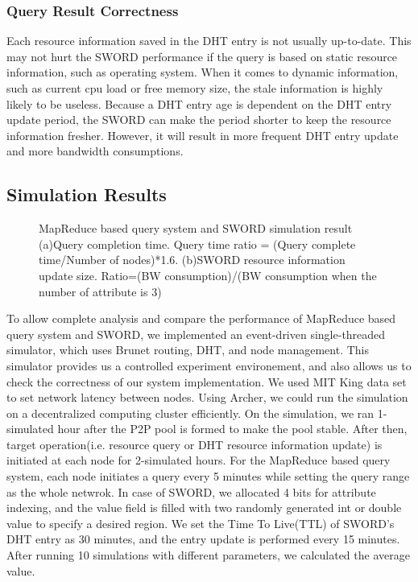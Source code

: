\documentclass{acm_proc_article-sp}
\begin{document}
\subsubsection{Query Result Correctness}
Each resource information saved in the DHT entry is not usually up-to-date. This may not hurt the SWORD performance if the query is based on static resource information, such as operating system. 
When it comes to dynamic information, such as current cpu load or free memory size, the stale information is highly likely to be useless. 
Because a DHT entry age is dependent on the DHT entry update period, the SWORD can make the period shorter to keep the resource information fresher.
However, it will result in more frequent DHT entry update and more bandwidth consumptions.
\subsection{Simulation Results}
\begin{figure}[t]
\centering
{}
\caption{MapReduce based query system and SWORD simulation result (a)Query completion time. Query time ratio = (Query complete time/Number of nodes)*1.6. 
(b)SWORD resource information update size. Ratio=(BW consumption)/(BW consumption when the number of attribute is 3)}
\end{figure}
To allow complete analysis and compare the performance of MapReduce based query system and SWORD, we implemented an event-driven single-threaded simulator, which uses Brunet\cite{brunet} routing, DHT, and node management.
This simulator provides us a controlled experiment environement, and also allows us to check the correctness of our system implementation. We used MIT King data set\cite{king} to set network latency between nodes.
Using Archer\cite{archer}, we could run the simulation on a decentralized computing cluster efficiently. 
On the simulation, we ran 1-simulated hour after the P2P pool is formed to make the pool stable. After then, target operation(i.e. resource query or DHT resource information update) is initiated at each node for 2-simulated hours.
For the MapReduce based query system, each node initiates a query every 5 minutes while setting the query range as the whole netwrok. 
In case of SWORD, we allocated 4 bits for attribute indexing, and the value field is filled with two randomly generated int or double value to specify a desired region. 
We set the Time To Live(TTL) of SWORD's DHT entry as 30 minutes, and the entry update is performed every 15 minutes.
After running 10 simulations with different parameters, we calculated the average value.
\end{document}
